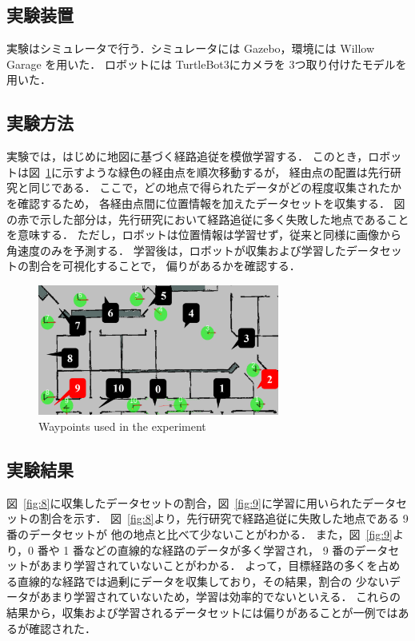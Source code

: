 \documentclass{jarticle}
\renewcommand{\figurename}{図~}
\newcommand{\figref}[1]{\figurename\ref{#1}}
\begin{document}
\subsection{実験装置}
実験はシミュレータで行う．シミュレータには Gazebo\cite{gazebo}，環境には Willow Garage を用いた．
ロボットには TurtleBot3\cite{TurtleBot3}にカメラを 3つ取り付けたモデルを用いた．

\subsection{実験方法}
実験では，はじめに地図に基づく経路追従を模倣学習する．
このとき，ロボットは\figref{fig:6}に示すような緑色の経由点を順次移動するが，
経由点の配置は先行研究と同じである．
ここで，どの地点で得られたデータがどの程度収集されたかを確認するため，
各経由点間に位置情報を加えたデータセットを収集する．
図の赤で示した部分は，先行研究において経路追従に多く失敗した地点であることを意味する．
ただし，ロボットは位置情報は学習せず，従来と同様に画像から角速度のみを予測する．
学習後は，ロボットが収集および学習したデータセットの割合を可視化することで，
偏りがあるかを確認する．

\begin{figure}[h!]
  \centering
   \includegraphics[height=43mm]{./pdf/location.pdf}
   \caption{Waypoints used in the experiment}
   \label{fig:6}
\end{figure}

\subsection{実験結果}
\figref{fig:8}に収集したデータセットの割合，\figref{fig:9}に学習に用いられたデータセットの割合を示す．
\figref{fig:8}より，先行研究で経路追従に失敗した地点である 9 番のデータセットが
他の地点と比べて少ないことがわかる．
また，\figref{fig:9}より，0 番や 1 番などの直線的な経路のデータが多く学習され，
9 番のデータセットがあまり学習されていないことがわかる．
よって，目標経路の多くを占める直線的な経路では過剰にデータを収集しており，その結果，割合の
少ないデータがあまり学習されていないため，学習は効率的でないといえる．
これらの結果から，収集および学習されるデータセットには偏りがあることが一例ではあるが確認された．
\end{document}
